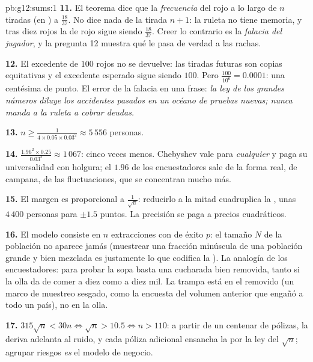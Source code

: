 \begin{solution}{pb:g12:sums:1}
\textbf{11.} El teorema dice que la \emph{frecuencia} del rojo a lo largo
de $n$ tiradas  (en ) a $\frac{18}{37}$. No dice nada
de la tirada $n + 1$: la ruleta no tiene memoria, y tras diez rojos la
 de rojo sigue siendo $\frac{18}{37}$. Creer lo contrario es la
\emph{falacia del jugador}, y la pregunta 12 muestra qué le pasa de verdad
a las rachas.

\textbf{12.} El excedente de $100$ rojos no se devuelve: las tiradas
futuras son copias equitativas y el excedente esperado sigue siendo $100$.
Pero $\frac{100}{10^6} = 0.0001$: una centésima de punto. El error de la
falacia en una frase: \emph{la ley de los grandes números diluye los
accidentes pasados en un océano de pruebas nuevas; nunca manda a la ruleta
a cobrar deudas.}

\textbf{13.} $n \geq \frac{1}{4 \times 0.05 \times 0.03^2} \approx 5\,556$
personas.

\textbf{14.} $\frac{1.96^2 \times 0.25}{0.03^2} \approx 1\,067$: cinco
veces menos. Chebyshev vale para \emph{cualquier}  y paga su
universalidad con holgura; el $1.96$ de los encuestadores sale de la forma
real, de campana, de las fluctuaciones, que se concentran mucho más.

\textbf{15.} El margen es proporcional a $\frac{1}{\sqrt n}$: reducirlo a
la mitad cuadruplica la , unas $4\,400$ personas para
$\pm 1.5$ puntos. La precisión se paga a precios cuadráticos.

\textbf{16.} El modelo consiste en $n$ extracciones  con
 de éxito $p$: el tamaño $N$ de la población no aparece jamás
(muestrear una fracción minúscula de una población grande y bien mezclada
es justamente lo que codifica la ). La analogía de los
encuestadores: para probar la sopa basta una cucharada bien removida, tanto
si la olla da de comer a diez como a diez mil. La trampa está en el
removido (un marco de muestreo sesgado, como la encuesta del volumen
anterior que engañó a todo un país), no en la olla.

\textbf{17.} $315\sqrt n < 30n \iff \sqrt n > 10.5 \iff n > 110$: a partir
de un centenar de pólizas, la deriva adelanta al ruido, y cada póliza
adicional ensancha la  por la ley del $\sqrt n$; agrupar riesgos
\emph{es} el modelo de negocio.


\end{solution}
